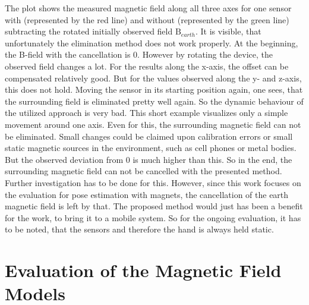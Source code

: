 The plot shows the measured magnetic field along all three axes for one sensor with (represented by the red line) and without (represented by the green line) subtracting the rotated initially observed field $ \mathrm{B}_{earth} $. It is visible, that unfortunately the elimination method does not work properly. At the beginning, the B-field with the cancellation is 0. However by rotating the device, the observed field changes a lot. For the results along the x-axis, the offset can be compensated relatively good. But for the values observed along the y- and z-axis, this does not hold. Moving the sensor in its starting position again, one sees, that the surrounding field is eliminated pretty well again. So the dynamic behaviour of the utilized approach is very bad. This short example visualizes only a simple movement around one axis. Even for this, the surrounding magnetic field can not be eliminated. Small changes could be claimed upon calibration errors or small static magnetic sources in the environment, such as cell phones or metal bodies. But the observed deviation from 0 is much higher than this. So in the end, the surrounding magnetic field can not be cancelled with the presented method. Further investigation has to be done for this. However, since this work focuses on the evaluation for pose estimation with magnets, the cancellation of the earth magnetic field is left by that. The proposed method would just has been a benefit for the work, to bring it to a mobile system. So for the ongoing evaluation, it has to be noted, that the sensors and therefore the hand is always held static. 


\section{Evaluation of the Magnetic Field Models} \label{sec:modelDif}

